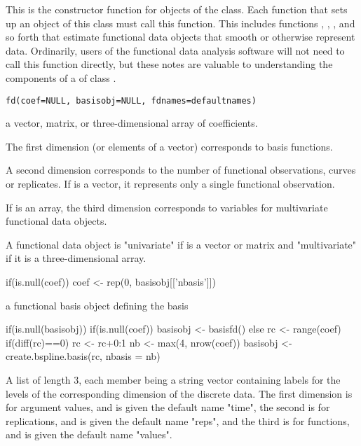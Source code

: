 \documentclass{article}
\begin{document}
\begin{Description}\relax
This is the constructor function for objects of the  class.
Each function that sets up an object of this class must call this
function.  This includes functions ,
, , and so forth that estimate
functional data objects that smooth or otherwise represent data.
Ordinarily, users of the functional data analysis software will not
need to call this function directly, but these notes are valuable to
understanding the components of a  of class .
\end{Description}
\begin{Usage}
\begin{verbatim}
fd(coef=NULL, basisobj=NULL, fdnames=defaultnames)
\end{verbatim}
\end{Usage}
\begin{Arguments}
\begin{ldescription}
\item[\code{coef}] a vector, matrix, or three-dimensional array of coefficients.

The first dimension (or elements of a vector) corresponds to basis
functions.

A second dimension corresponds to the number of functional
observations, curves or replicates.  If  is a vector, it
represents only a single functional observation.

If  is an array, the third dimension corresponds to
variables for multivariate functional data objects.

A functional data object is "univariate" if  is a vector
or matrix and "multivariate" if it is a three-dimensional array.

if(is.null(coef)) coef <- rep(0, basisobj[['nbasis']])

\item[\code{basisobj}] a functional basis object defining the basis

if(is.null(basisobj)){
if(is.null(coef)) basisobj <- basisfd()
else {
rc <- range(coef)
if(diff(rc)==0) rc <- rc+0:1
nb <- max(4, nrow(coef))
basisobj <- create.bspline.basis(rc, nbasis = nb)
}
}

\item[\code{fdnames}] A list of length 3, each member being a string vector containing
labels for the levels of the corresponding dimension of the discrete
data.  The first dimension is for argument values, and is given the
default name "time", the second is for replications, and is given
the default name "reps", and the third is for functions, and is
given the default name "values".

\end{ldescription}
\end{Arguments}
\end{document}
